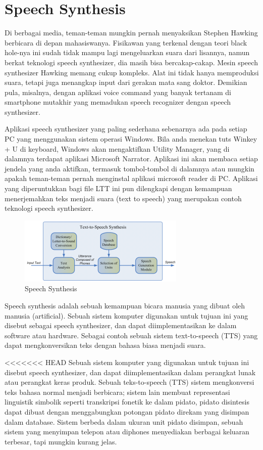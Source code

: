 \section{Speech Synthesis}
Di berbagai media, teman-teman mungkin pernah menyaksikan Stephen Hawking berbicara di depan mahasiswanya. Fisikawan yang terkenal dengan teori black hole-nya ini sudah tidak mampu lagi mengeluarkan suara dari lisannya, namun berkat teknologi speech synthesizer, dia masih bisa bercakap-cakap. Mesin speech synthesizer Hawking memang cukup kompleks. Alat ini tidak hanya memproduksi suara, tetapi juga menangkap input dari gerakan mata sang doktor. Demikian pula, misalnya, dengan aplikasi voice command yang banyak tertanam di smartphone mutakhir yang memadukan speech recognizer dengan speech synthesizer.

Aplikasi speech synthesizer yang paling sederhana sebenarnya ada pada setiap PC yang menggunakan sistem operasi Windows. Bila anda menekan tuts Winkey + U di keyboard, Windows akan mengaktifkan Utility Manager, yang di dalamnya terdapat aplikasi Microsoft Narrator. Aplikasi ini akan membaca setiap jendela yang anda aktifkan, termasuk tombol-tombol di dalamnya atau mungkin apakah teman-teman pernah menginstal aplikasi microsoft reader di PC. Aplikasi yang diperuntukkan bagi file LTT ini pun dilengkapi dengan kemampuan menerjemahkan teks menjadi suara (text to speech) yang merupakan contoh teknologi speech synthesizer.

\begin{figure}[H]
        \centerline{\includegraphics[scale=.75]{figures/speech}}
        \caption{Speech Synthesis}
		\label{speech}
\end{figure}

Speech synthesis adalah sebuah kemampuan bicara manusia yang dibuat oleh manusia (artificial). Sebuah sistem komputer digunakan untuk tujuan ini yang disebut sebagai speech synthesizer, dan dapat diimplementasikan ke dalam software atau hardware. Sebagai contoh sebuah sistem text-to-speech (TTS) yang dapat mengkonversikan teks dengan bahasa biasa menjadi suara\cite{8682816}.

<<<<<<< HEAD
Sebuah sistem komputer yang digunakan untuk tujuan ini disebut speech synthesizer, dan dapat diimplementasikan dalam perangkat lunak atau perangkat keras produk. Sebuah teks-to-speech (TTS) sistem mengkonversi teks bahasa normal menjadi berbicara; sistem lain membuat representasi linguistik simbolik seperti transkripsi fonetik ke dalam pidato, pidato disintesis dapat dibuat dengan menggabungkan potongan pidato direkam yang disimpan dalam database. Sistem berbeda dalam ukuran unit pidato disimpan, sebuah sistem yang menyimpan telepon atau diphones menyediakan berbagai keluaran terbesar, tapi mungkin kurang jelas\cite{li2017deep}.

